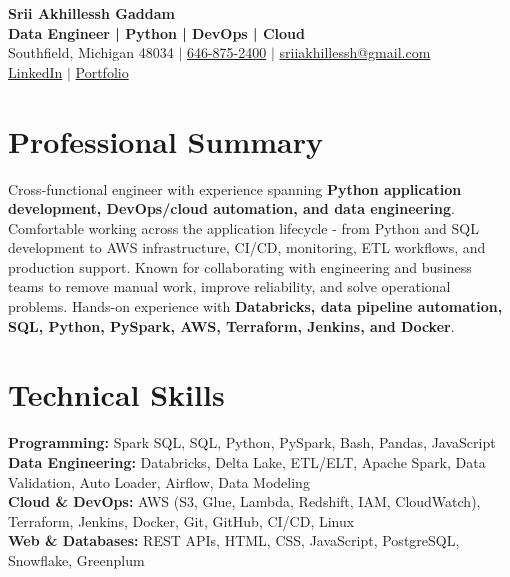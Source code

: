 \documentclass[letterpaper,10pt]{article}
\begin{document}
\fontsize{9.35pt}{10.45pt}\selectfont

\begin{center}
    {\LARGE \textbf{Srii Akhillessh Gaddam}} \\[-1pt]
    \textbf{Data Engineer | Python | DevOps | Cloud} \\[2pt]
    Southfield, Michigan 48034 $|$
    \href{tel:6468752400}{646-875-2400} $|$
    \href{mailto:sriiakhillessh@gmail.com}{sriiakhillessh@gmail.com} \\[1pt]
    \href{https://www.linkedin.com/in/srii-akhiilessh-gaddam-b48668191/}{LinkedIn} $|$
    \href{https://sriiakhillesshg.github.io/portfolio/}{Portfolio}
\end{center}
\vspace{-8pt}

\section{Professional Summary}
\small{Cross-functional engineer with experience spanning \textbf{Python application development, DevOps/cloud automation, and data engineering}. Comfortable working across the application lifecycle - from Python and SQL development to AWS infrastructure, CI/CD, monitoring, ETL workflows, and production support. Known for collaborating with engineering and business teams to remove manual work, improve reliability, and solve operational problems. Hands-on experience with \textbf{Databricks, data pipeline automation, SQL, Python, PySpark, AWS, Terraform, Jenkins, and Docker}.}

\section{Technical Skills}
\small{
\textbf{Programming:} Spark SQL, SQL, Python, PySpark, Bash, Pandas, JavaScript \\
\textbf{Data Engineering:} Databricks, Delta Lake, ETL/ELT, Apache Spark, Data Validation, Auto Loader, Airflow, Data Modeling \\
\textbf{Cloud \& DevOps:} AWS (S3, Glue, Lambda, Redshift, IAM, CloudWatch), Terraform, Jenkins, Docker, Git, GitHub, CI/CD, Linux \\
\textbf{Web \& Databases:} REST APIs, HTML, CSS, JavaScript, PostgreSQL, Snowflake, Greenplum
}

\end{document}
